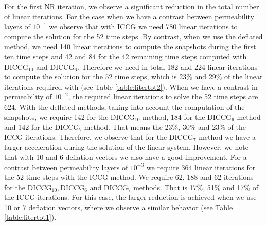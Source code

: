 \documentclass[12pt]{article}
\numberwithin{equation}{section}
\begin{document}
For the first NR iteration, we observe a significant reduction in the total number of linear iterations. For the case when we have a contrast between permeability layers of $10^{-1}$ we observe that with ICCG we need 780 linear iterations to compute the solution for the 52 time steps. By contrast, when we use the deflated method, we need 140 linear iterations to compute the snapshots during the first ten time steps and 42 and 84 for the 42 remaining time steps computed with DICCG$_{10}$ and DICCG$_6$. Therefore we need in total 182 and 224 linear iterations to compute the solution for the 52 time steps, which is 23\% and 29\% of the linear iterations required with (see Table \ref{table:litertot2}).
When we have a contrast in permeability of $10^{-2}$, the required linear iterations to solve the 52 time steps are 624. With the deflated methods, taking into account the computation of the snapshots, we require 142 for the DICCG$_{10}$ method, 184 for the DICCG$_6$ method and 142 for the DICCG$_7$ method. That means the 23\%, 30\% and 23\% of the ICCG iterations. Therefore, we observe that for the DICCG$_7$ method we have a larger acceleration during the solution of the linear system. However, we note that with 10 and 6 deflation vectors we also have a good improvement.
For a contrast between permeability layers of $10^{-3}$ we require 364 linear iterations for the 52 time steps with the ICCG method. We require 62, 188 and 62 iterations for the DICCG$_{10}, $DICCG$_6$ and DICCG$_7$ methods. That is 17\%, 51\% and 17\% of the ICCG iterations. For this case, the larger reduction is achieved when we use 10 or 7 deflation vectors, where we observe a similar behavior (see Table \ref{table:litertot1}).\\
\end{document}
